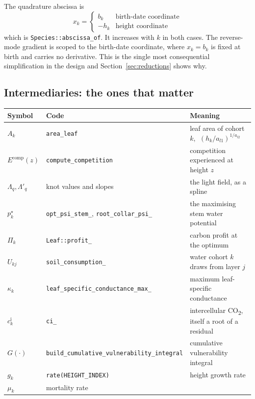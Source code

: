 \documentclass[11pt,a4paper]{article}
\newcommand{\code}[1]{\texttt{\small #1}}
\begin{document}
The quadrature abscissa is
\begin{equation}
x_k =
\begin{cases}
b_k & \text{birth-date coordinate} \\
-h_k & \text{height coordinate}
\end{cases}
\label{eq:abscissa}
\end{equation}
which is \code{Species::abscissa\_of}. It increases with $k$ in both cases. The
reverse-mode gradient is scoped to the birth-date coordinate, where $x_k = b_k$ is
fixed at birth and carries no derivative. This is the single most consequential
simplification in the design and Section~\ref{sec:reductions} shows why.

\subsection{Intermediaries: the ones that matter}

\begin{longtable}{@{}llp{}@{}}
\toprule
Symbol & Code & Meaning \\
\midrule
$A_k$ & \code{area\_leaf} & leaf area of cohort $k$, $\;(h_k/a_{l1})^{1/a_{l2}}$ \\
$E^{\mathrm{comp}}(z)$ & \code{compute\_competition} & competition experienced at height $z$ \\
$\Lambda_q, \Lambda'_q$ & knot values and slopes & the light field, as a spline \\
$p^\star_k$ & \code{opt\_psi\_stem\_}, \code{root\_collar\_psi\_} & the maximising stem water potential \\
$\Pi_k$ & \code{Leaf::profit\_} & carbon profit at the optimum \\
$U_{kj}$ & \code{soil\_consumption\_} & water cohort $k$ draws from layer $j$ \\
$\kappa_k$ & \code{leaf\_specific\_conductance\_max\_} & maximum leaf-specific conductance \\
$c^{\mathrm{i}}_k$ & \code{ci\_} & intercellular CO\textsubscript{2}, itself a root of a residual \\
$G(\cdot)$ & \code{build\_cumulative\_vulnerability\_integral} & cumulative vulnerability integral \\
$g_k$ & \code{rate(HEIGHT\_INDEX)} & height growth rate \\
$\mu_k$ & mortality rate & \\
\bottomrule
\end{longtable}
\end{document}
